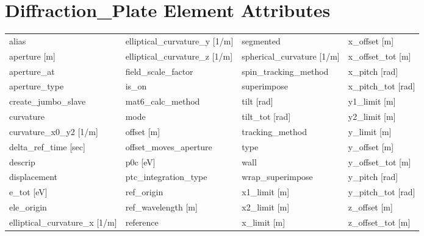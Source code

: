  \section{Diffraction_Plate Element Attributes}
 \label{s:list.diffraction.plate}
 
 \begin{tabular}{llll} \toprule
alias                            & elliptical_curvature_y [1/m]     & segmented                        & x_offset [m]                     \\
aperture [m]                     & elliptical_curvature_z [1/m]     & spherical_curvature [1/m]        & x_offset_tot [m]                 \\
aperture_at                      & field_scale_factor               & spin_tracking_method             & x_pitch [rad]                    \\
aperture_type                    & is_on                            & superimpose                      & x_pitch_tot [rad]                \\
create_jumbo_slave               & mat6_calc_method                 & tilt [rad]                       & y1_limit [m]                     \\
curvature                        & mode                             & tilt_tot [rad]                   & y2_limit [m]                     \\
curvature_x0_y2 [1/m]            & offset [m]                       & tracking_method                  & y_limit [m]                      \\
delta_ref_time [sec]             & offset_moves_aperture            & type                             & y_offset [m]                     \\
descrip                          & p0c [eV]                         & wall                             & y_offset_tot [m]                 \\
displacement                     & ptc_integration_type             & wrap_superimpose                 & y_pitch [rad]                    \\
e_tot [eV]                       & ref_origin                       & x1_limit [m]                     & y_pitch_tot [rad]                \\
ele_origin                       & ref_wavelength [m]               & x2_limit [m]                     & z_offset [m]                     \\
elliptical_curvature_x [1/m]     & reference                        & x_limit [m]                      & z_offset_tot [m]                 \\
 \bottomrule
 \end{tabular}
 \vfill
 
